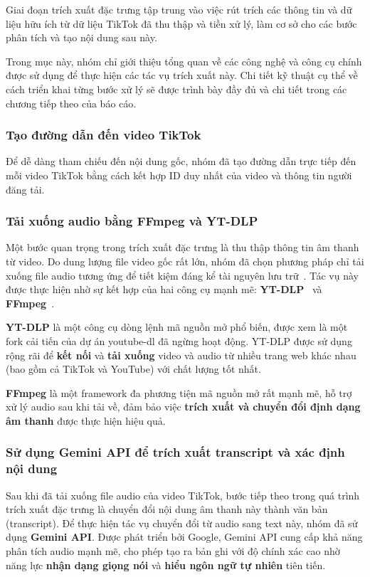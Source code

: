 Giai đoạn trích xuất đặc trưng tập trung vào việc rút trích các thông tin và dữ liệu hữu ích từ dữ liệu TikTok đã thu thập và tiền xử lý, làm cơ sở cho các bước phân tích và tạo nội dung sau này.

Trong mục này, nhóm chỉ giới thiệu tổng quan về các công nghệ và công cụ chính được sử dụng để thực hiện các tác vụ trích xuất này. Chi tiết kỹ thuật cụ thể về cách triển khai từng bước xử lý sẽ được trình bày đầy đủ và chi tiết trong các chương tiếp theo của báo cáo.

\subsubsection{Tạo đường dẫn đến video TikTok}

Để dễ dàng tham chiếu đến nội dung gốc, nhóm đã tạo đường dẫn trực tiếp đến mỗi video TikTok bằng cách kết hợp ID duy nhất của video và thông tin người đăng tải.

\subsubsection{Tải xuống audio bằng FFmpeg và YT-DLP}

Một bước quan trọng trong trích xuất đặc trưng là thu thập thông tin âm thanh từ video. Do dung lượng file video gốc rất lớn, nhóm đã chọn phương pháp chỉ tải xuống file audio tương ứng để tiết kiệm đáng kể tài nguyên lưu trữ~\cite{video_to_audio}. Tác vụ này được thực hiện nhờ sự kết hợp của hai công cụ mạnh mẽ: \textbf{YT-DLP}~\cite{ytdlp} và \textbf{FFmpeg}~\cite{ffmpeg}.

\textbf{YT-DLP} là một công cụ dòng lệnh mã nguồn mở phổ biến, được xem là một fork cải tiến của dự án youtube-dl đã ngừng hoạt động. YT-DLP được sử dụng rộng rãi để \textbf{kết nối} và \textbf{tải xuống} video và audio từ nhiều trang web khác nhau (bao gồm cả TikTok và YouTube) với chất lượng tốt nhất.

\textbf{FFmpeg} là một framework đa phương tiện mã nguồn mở rất mạnh mẽ, hỗ trợ xử lý audio sau khi tải về, đảm bảo việc \textbf{trích xuất và chuyển đổi định dạng âm thanh} được thực hiện hiệu quả.

\subsubsection{Sử dụng Gemini API để trích xuất transcript và xác định nội dung}

Sau khi đã tải xuống file audio của video TikTok, bước tiếp theo trong quá trình trích xuất đặc trưng là chuyển đổi nội dung âm thanh này thành văn bản (transcript). Để thực hiện tác vụ chuyển đổi từ audio sang text này, nhóm đã sử dụng \textbf{Gemini API}. Được phát triển bởi Google, Gemini API cung cấp khả năng phân tích audio mạnh mẽ, cho phép tạo ra bản ghi với độ chính xác cao nhờ năng lực \textbf{nhận dạng giọng nói} và \textbf{hiểu ngôn ngữ tự nhiên} tiên tiến.

